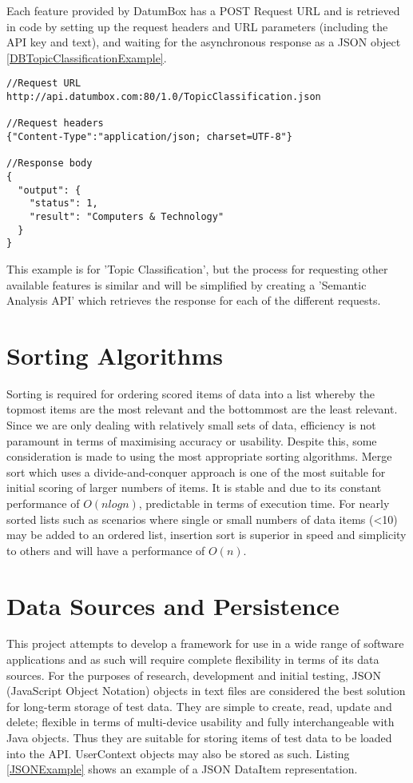 Each feature provided by DatumBox has a POST Request URL and is retrieved in code by setting up the request headers and URL parameters (including the API key and text), and waiting for the asynchronous response as a JSON object \ref{DBTopicClassificationExample}.

\lstset{language=Java, caption=DatumBox Topic Classification example, label=DBTopicClassificationExample}
\begin{lstlisting}
//Request URL
http://api.datumbox.com:80/1.0/TopicClassification.json

//Request headers
{"Content-Type":"application/json; charset=UTF-8"}

//Response body
{
  "output": {
    "status": 1,
    "result": "Computers & Technology"
  }
}
\end{lstlisting}
This example is for 'Topic Classification', but the process for requesting other available features is similar and will be simplified by creating a 'Semantic Analysis API' which retrieves the response for each of the different requests. 

\section{Sorting Algorithms}

Sorting is required for ordering scored items of data into a list whereby the topmost items are the most relevant and the bottommost are the least relevant. Since we are only dealing with relatively small sets of data, efficiency is not paramount in terms of maximising accuracy or usability. Despite this, some consideration is made to using the most appropriate sorting algorithms. 
Merge sort which uses a divide-and-conquer approach is one of the most suitable for initial scoring of larger numbers of items. It is stable and due to its constant performance of $O(nlogn)$, predictable in terms of execution time. 
For nearly sorted lists such as scenarios where single or small numbers of data items (<10) may be added to an ordered list, insertion sort is superior in speed and simplicity to others and will have a performance of $O(n)$.

\section{Data Sources and Persistence}

This project attempts to develop a framework for use in a wide range of software applications and as such will require complete flexibility in terms of its data sources. For the purposes of research, development and initial testing, JSON (JavaScript Object Notation) objects in text files are considered the best solution for long-term storage of test data. They are simple to create, read, update and delete; flexible in terms of multi-device usability and fully interchangeable with Java objects. Thus they are suitable for storing items of test data to be loaded into the API. UserContext objects may also be stored as such. Listing \ref{JSONExample} shows an example of a JSON DataItem representation.

